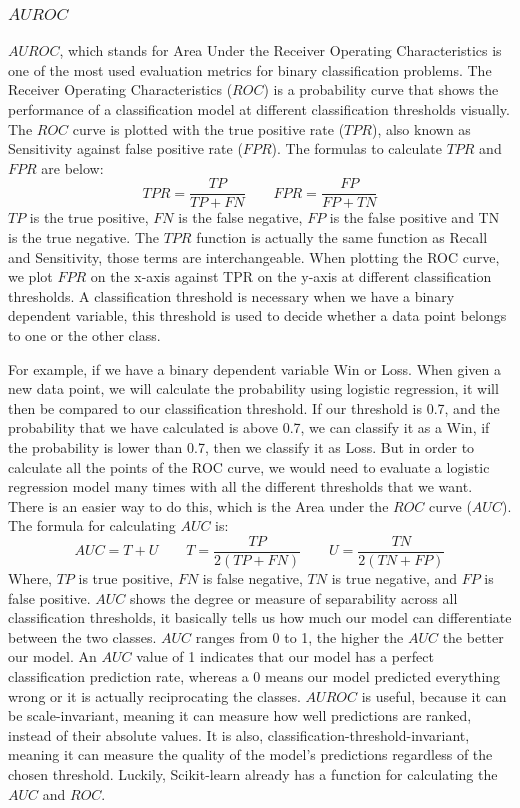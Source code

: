 \documentclass[a4paper,12pt]{report}
\begin{document}
\subsubsection{$AUROC$}

$AUROC$, which stands for Area Under the Receiver Operating Characteristics is one of the most used evaluation metrics for binary classification problems. The Receiver Operating Characteristics ($ROC$) is a probability curve that shows the performance of a classification model at different classification thresholds visually. The $ROC$ curve is plotted with the true positive rate ($TPR$), also known as Sensitivity against false positive rate ($FPR$). The formulas to calculate $TPR$ and $FPR$ are below:
$$TPR=\frac{TP}{TP+FN}\qquad FPR=\frac{FP}{FP+TN}$$
$TP$ is the true positive, $FN$ is the false negative, $FP$ is the false positive and TN is the true negative. The $TPR$ function is actually the same function as Recall and Sensitivity, those terms are interchangeable. When plotting the ROC curve, we plot $FPR$ on the x-axis against TPR on the y-axis at different classification thresholds. A classification threshold is necessary when we have a binary dependent variable, this threshold is used to decide whether a data point belongs to one or the other class.

For example, if we have a binary dependent variable Win or Loss. When given a new data point, we will calculate the probability using logistic regression, it will then be compared to our classification threshold. If our threshold is 0.7, and the probability that we have calculated is above 0.7, we can classify it as a Win, if the probability is lower than 0.7, then we classify it as Loss. But in order to calculate all the points of the ROC curve, we would need to evaluate a logistic regression model many times with all the different thresholds that we want. There is an easier way to do this, which is the Area under the $ROC$ curve ($AUC$). The formula for calculating $AUC$ is:
$$AUC=T+U\qquad T=\frac{TP}{2(TP+FN)}\qquad U=\frac{TN}{2(TN+FP)}$$
Where, $TP$ is true positive, $FN$ is false negative, $TN$ is true negative, and $FP$ is false positive. $AUC$ shows the degree or measure of separability across all classification thresholds, it basically tells us how much our model can differentiate between the two classes. $AUC$ ranges from 0 to 1, the higher the $AUC$ the better our model. An $AUC$ value of 1 indicates that our model has a perfect classification prediction rate, whereas a 0 means our model predicted everything wrong or it is actually reciprocating the classes. $AUROC$ is useful, because it can be scale-invariant, meaning it can measure how well predictions are ranked, instead of their absolute values. It is also, classification-threshold-invariant, meaning it can measure the quality of the model’s predictions regardless of the chosen threshold. Luckily, Scikit-learn already has a function for calculating the $AUC$ and $ROC$.     
\end{document}
